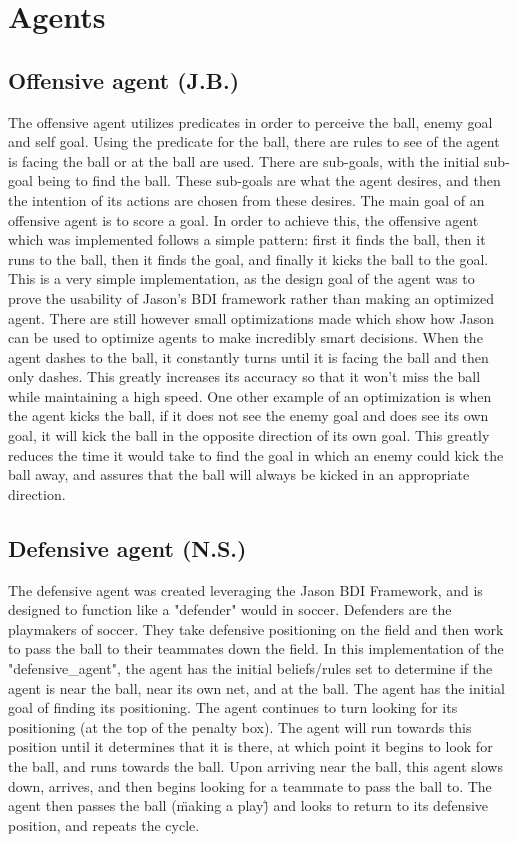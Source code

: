 \documentclass[conference]{IEEEtran}
\begin{document}
\section{Agents}

\subsection{Offensive agent (J.B.)}
The offensive agent utilizes predicates in order to perceive the ball, enemy goal and self goal.
Using the predicate for the ball, there are rules to see of the agent is facing the ball or at the ball are used.
There are sub-goals, with the initial sub-goal being to find the ball.
These sub-goals are what the agent desires, and then the intention of its actions are chosen from these desires.
The main goal of an offensive agent is to score a goal.
In order to achieve this, the offensive agent which was implemented follows a simple pattern: first it finds the ball, then it runs to the ball, then it finds the goal, and finally it kicks the ball to the goal.
This is a very simple implementation, as the design goal of the agent was to prove the usability of Jason's BDI framework rather than making an optimized agent.
There are still however small optimizations made which show how Jason can be used to optimize agents to make incredibly smart decisions.
When the agent dashes to the ball, it constantly turns until it is facing the ball and then only dashes.
This greatly increases its accuracy so that it won't miss the ball while maintaining a high speed.
One other example of an optimization is when the agent kicks the ball, if it does not see the enemy goal and does see its own goal, it will kick the ball in the opposite direction of its own goal.
This greatly reduces the time it would take to find the goal in which an enemy could kick the ball away, and assures that the ball will always be kicked in an appropriate direction.

\subsection{Defensive agent (N.S.)}
The defensive agent was created leveraging the Jason BDI Framework, and is designed to function like a "defender" would in soccer.
Defenders are the playmakers of soccer.
They take defensive positioning on the field and then work to pass the ball to their teammates down the field.
In this implementation of the "defensive\_agent", the agent has the initial beliefs/rules set to determine if the agent is near the ball, near its own net, and at the ball.
The agent has the initial goal of finding its positioning.
The agent continues to turn looking for its positioning (at the top of the penalty box).
The agent will run towards this position until it determines that it is there, at which point it begins to look for the ball, and runs towards the ball.
Upon arriving near the ball, this agent slows down, arrives, and then begins looking for a teammate to pass the ball to.
The agent then passes the ball (\"making a play\") and looks to return to its defensive position, and repeats the cycle.
\end{document}
